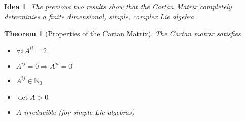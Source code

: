 \documentclass{article}
\newtheorem{theorem}{Theorem}[subsection]
\newtheorem*{idea}{Idea}
\newcommand{\mbb}[1]{\mathbb{#1}}
\begin{document}
\begin{idea}
The previous two results show that the Cartan Matrix completely determinies a finite dimensional, simple, complex Lie algebra. 
\end{idea}

\begin{theorem}[Properties of the Cartan Matrix]
The Cartan matrix satisfies
\begin{itemize}
    \item $\forall i \, A^{ii}=2$
    \item $A^{ij}=0 \Rightarrow A^{ji}=0$
    \item $A^{ij}\in\mbb{N}_0$
    \item $\det{A}>0$
    \item $A$ irreducible (for simple Lie algebras)
\end{itemize}
\end{theorem}
\end{document}
